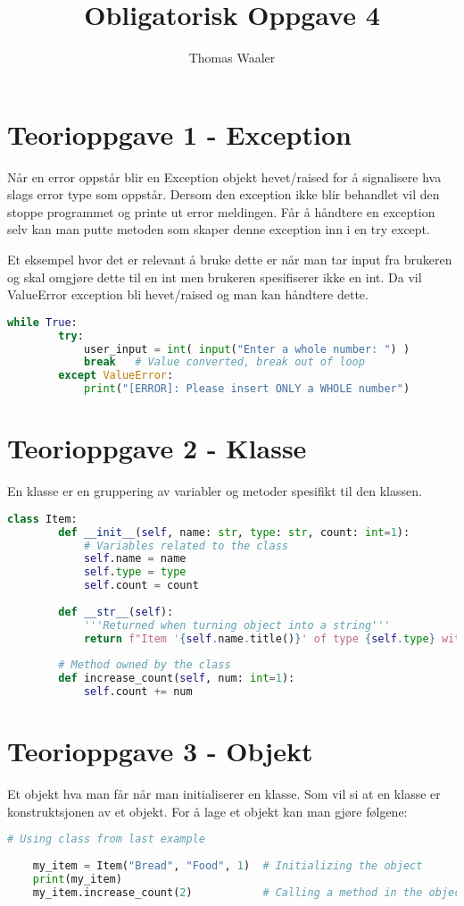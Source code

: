 \documentclass[10pt,a4paper]{article}
\author{Thomas Waaler}
\title{Obligatorisk Oppgave 4}
\begin{document}
\maketitle


\section*{Teorioppgave 1 - Exception}
Når en error oppstår blir en Exception objekt hevet/raised for å signalisere hva slags error type som oppstår. Dersom den exception ikke blir behandlet vil den stoppe programmet og printe ut error meldingen. Får å håndtere en exception selv kan man putte metoden som skaper denne exception inn i en try except.

Et eksempel hvor det er relevant å bruke dette er når man tar input fra brukeren og skal omgjøre dette til en int men brukeren spesifiserer ikke en int. Da vil ValueError exception bli hevet/raised og man kan håndtere dette.

\begin{lstlisting}[language=Python]
	while True:
		try:
			user_input = int( input("Enter a whole number: ") )
			break	# Value converted, break out of loop
		except ValueError:
			print("[ERROR]: Please insert ONLY a WHOLE number")
\end{lstlisting}

\section*{Teorioppgave 2 - Klasse}
En klasse er en gruppering av variabler og metoder spesifikt til den klassen.

\begin{lstlisting}[language=Python]
	class Item:
		def __init__(self, name: str, type: str, count: int=1):
			# Variables related to the class			
			self.name = name
			self.type = type			
			self.count = count
		
		def __str__(self):
			'''Returned when turning object into a string'''
			return f"Item '{self.name.title()}' of type {self.type} with a count of {self.count}"
		
		# Method owned by the class
		def increase_count(self, num: int=1):
			self.count += num
\end{lstlisting}

\section*{Teorioppgave 3 - Objekt}
Et objekt hva man får når man initialiserer en klasse. Som vil si at en klasse er konstruktsjonen av et objekt. For å lage et objekt kan man gjøre følgene:


\begin{lstlisting}[language=Python]
	# Using class from last example
	
	my_item = Item("Bread", "Food", 1)	# Initializing the object
	print(my_item)
	my_item.increase_count(2)			# Calling a method in the object
\end{lstlisting}
\end{document}
